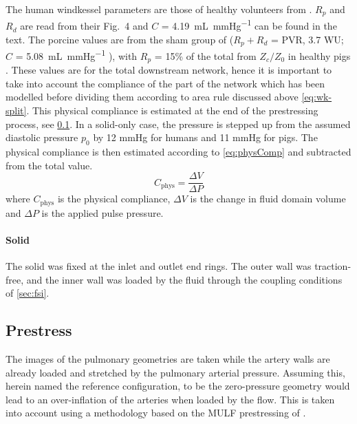 The human windkessel parameters are those of healthy volunteers from \citet{lunguMRIModelbasedNoninvasive2014}.
$R_p$ and $R_d$ are read from their Fig.~4 and $C$ = \SI{4.19}{\milli\liter\per\mmHg} can be found in the text.
The porcine values are from the sham group of \citet{garcia-lunar2024metabolic} ($R_p + R_d$ = PVR, 3.7 WU; $C$ = \SI{5.08}{\milli\liter\per\mmHg} ), with $R_p$ = 15\% of the total from $Z_c/Z_0$ in healthy pigs \citep{perezdelvillar2019natural}.
These values are for the total downstream network, hence it is important to take into account the compliance of the part of the network which has been modelled before dividing them according to area rule discussed above \cref{eq:wk-split}.
This physical compliance is estimated at the end of the prestressing process, see \cref{sec:prestress}.
In a solid-only case, the pressure is stepped up from the assumed diastolic pressure $p_0$ by 12 mmHg for humans and 11 mmHg for pigs.
The physical compliance is then estimated according to \cref{eq:physComp} and subtracted from the total value.
\begin{equation}
  C_\mathrm{phys} = \frac{\Delta V}{\Delta P}
  \label{eq:physComp}
\end{equation}
where $C_\mathrm{phys}$ is the physical compliance, $\Delta V$ is the change in fluid domain volume and $\Delta P$ is the applied pulse pressure.

\paragraph{Solid}
The solid was fixed at the inlet and outlet end rings.
The outer wall was traction-free, and the inner wall was loaded by the fluid through the coupling conditions of \cref{sec:fsi}.

\subsection{Prestress}\label{sec:prestress}

The images of the pulmonary geometries are taken while the artery walls are already loaded and stretched by the pulmonary arterial pressure.
Assuming this, herein named the reference configuration, to be the zero-pressure geometry would lead to an over-inflation of the arteries when loaded by the flow.
This is taken into account using a methodology based on the MULF prestressing of \citet{gee2010computational}.

